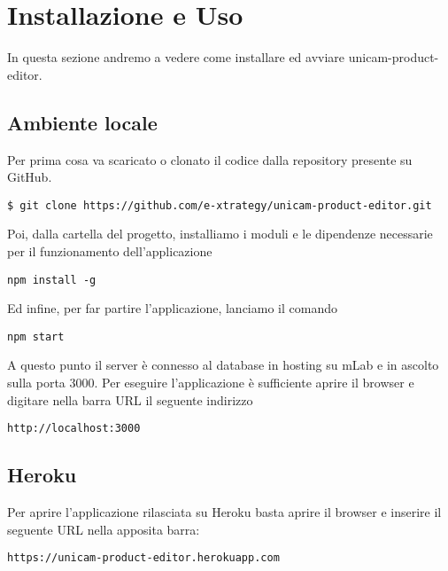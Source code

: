 \chapter{Installazione e Uso}
\label{chap:installazione_uso}
In questa sezione andremo a vedere come installare ed avviare unicam-product-editor.
\section{Ambiente locale}
Per prima cosa va scaricato o clonato il codice dalla repository presente su GitHub.
\begin{lstlisting}[style=javaScriptCode]
$ git clone https://github.com/e-xtrategy/unicam-product-editor.git
\end{lstlisting}
Poi, dalla cartella del progetto, installiamo i moduli e le dipendenze necessarie per il funzionamento dell'applicazione
\begin{lstlisting}[style=javaScriptCode]
npm install -g
\end{lstlisting}
Ed infine, per far partire l'applicazione, lanciamo il comando
\begin{lstlisting}[style=javaScriptCode]
npm start
\end{lstlisting}
A questo punto il server è connesso al database in hosting su mLab e in ascolto sulla porta 3000.
Per eseguire l'applicazione è sufficiente aprire il browser e digitare nella barra URL il seguente indirizzo
\begin{lstlisting}[style=javaScriptCode]
http://localhost:3000
\end{lstlisting}
\section{Heroku}
Per aprire l'applicazione rilasciata su Heroku basta aprire il browser e inserire il seguente URL nella apposita barra:
\begin{lstlisting}[style=javaScriptCode]
https://unicam-product-editor.herokuapp.com
\end{lstlisting}